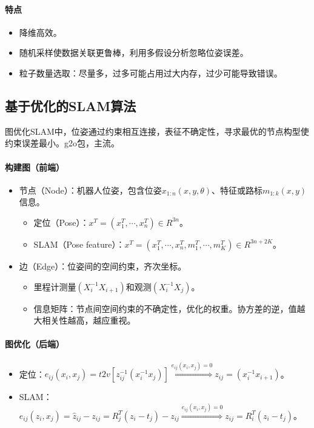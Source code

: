 \documentclass[
12pt, %
a4paper, 
oneside, %
headinclude,footinclude, %
]{scrartcl}
\begin{document}
\paragraph{特点}
\begin{itemize}
\item 降维高效。
\item 随机采样使数据关联更鲁棒，利用多假设分析忽略位姿误差。
\item 粒子数量选取：尽量多，过多可能占用过大内存，过少可能导致错误。
\end{itemize}
\subsection[基于优化的SLAM算法]{基于优化的SLAM算法}
图优化SLAM中，位姿通过约束相互连接，表征不确定性，寻求最优的节点构型使约束误差最小。g2o包，主流。
\paragraph{构建图（前端）}
\begin{itemize}
\item 节点（Node）：机器人位姿，包含位姿$ x_{1:n}(x, y, \theta) $、特征或路标$ m_{1:k}(x, y) $信息。
\begin{itemize}
\item 定位（Pose）：$ x^T = (x_1^T, \cdots, x_n^T) \in R^{3n} $。
\item SLAM（Pose feature）：$ x^T = (x_1^T, \cdots, x_n^T, m_1^T, \cdots, m_K^T) \in R^{3n + 2K} $。
\end{itemize}
\item 边（Edge）：位姿间的空间约束，齐次坐标。
\begin{itemize}
\item 里程计测量$ (X_i^{-1}X_{i + 1}) $和观测$ (X_i^{-1}X_j) $。
\item 信息矩阵：节点间空间约束的不确定性，优化的权重。协方差的逆，值越大相关性越高，越应重视。
\end{itemize}
\end{itemize}
\paragraph{图优化（后端）}
\begin{itemize}
\item 定位：$ e_{ij}(x_i, x_j) = t2v[z_{ij}^{-1}(x_i^{-1}x_j)] \overset{e_{ij}(x_i, x_j) = 0}{\Longrightarrow} z_{ij} = (x_i^{-1}x_{i + 1}) $。
\item SLAM：$ e_{ij}(z_i, x_j) = \hat{z}_{ij} - z_{ij} = R_j^T(z_i - t_j) - z_{ij} \overset{e_{ij}(x_i, x_j) = 0}{\Longrightarrow} z_{ij} = R_i^T(z_i - t_j) $。
\end{itemize}
\end{document}
